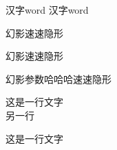 \documentclass[UTF8]{ctexart}
\begin{document}
汉字word
\CJKsetecglue{}
汉字word


幻影\phantom{参数}速速隐形

幻影\phantom{参数哈哈哈}速速隐形

幻影参数哈哈哈速速隐形

这是一行文字\\另一行

这是一行文字
\end{document}
